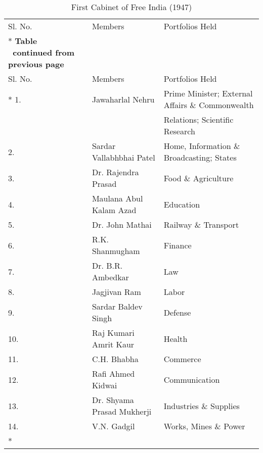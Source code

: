 \begin{longtable}[c]{@{}|p{1cm}|p{4cm}|p{7cm}|@{}}
	\caption{First Cabinet of Free India (1947)}
	\label{table:CH0102}\\
	\toprule
	Sl. No. & Members & Portfolios Held \\* \midrule
	\endfirsthead
	\multicolumn{3}{c}%
	{{\bfseries Table \thetable\ continued from previous page}} \\
	\toprule
	Sl. No. & Members & Portfolios Held \\* \midrule
	\endhead
	\bottomrule
	\endfoot
	\endlastfoot
	1. & Jawaharlal Nehru & Prime Minister; External Affairs \& Commonwealth \\
	&                           & Relations; Scientific Research \\
	2. & Sardar Vallabhbhai Patel & Home, Information \& Broadcasting; States \\
	3. & Dr. Rajendra Prasad & Food \& Agriculture \\
	4. & Maulana Abul Kalam Azad & Education \\
	5. & Dr. John Mathai & Railway \& Transport \\
	6. & R.K. Shanmugham & Finance \\
	7. & Dr. B.R. Ambedkar & Law \\
	8. & Jagjivan Ram & Labor \\
	9. & Sardar Baldev Singh & Defense \\
	10. & Raj Kumari Amrit Kaur & Health \\
	11. & C.H. Bhabha & Commerce \\
	12. & Rafi Ahmed Kidwai & Communication \\
	13. & Dr. Shyama Prasad Mukherji & Industries \& Supplies \\
	14. & V.N. Gadgil & Works, Mines \& Power \\* \bottomrule
\end{longtable}

\printendnotes
\cleardoublepage
